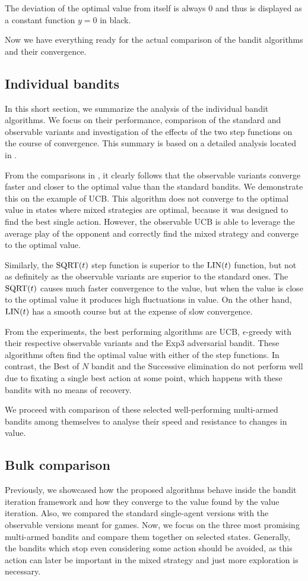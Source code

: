 \documentclass[../main.tex]{subfiles}
\begin{document}
The deviation of the optimal value from itself is always $0$ and thus is displayed as a constant function $y = 0$ in black.

Now we have everything ready for the actual comparison of the bandit algorithms and their convergence.

\subsection{Individual bandits}\label{exp:sg:individual}
In this short section, we summarize the analysis of the individual bandit algorithms.
We focus on their performance, comparison of the standard and observable variants and investigation of the effects of the two step functions on the course of convergence.
This summary is based on a detailed analysis located in .

From the comparisons in , it clearly follows that the observable variants converge faster and closer to the optimal value than the standard bandits.
We demonstrate this on the example of UCB.
This algorithm does not converge to the optimal value in states where mixed strategies are optimal, because it was designed to find the best single action.
However, the observable UCB is able to leverage the average play of the opponent and correctly find the mixed strategy and converge to the optimal value.

Similarly, the $\text{SQRT}(t)$ step function is superior to the $\text{LIN}(t)$ function, but not as definitely as the observable variants are superior to the standard ones.
The $\text{SQRT}(t)$ causes much faster convergence to the value, but when the value is close to the optimal value it produces high fluctuations in value.
On the other hand, $\text{LIN}(t)$ has a smooth course but at the expense of slow convergence.

From the experiments, the best performing algorithms are UCB, $\epsilon$-greedy with their respective observable variants and the Exp3 adversarial bandit.
These algorithms often find the optimal value with either of the step functions.
In contrast, the Best of $N$ bandit and the Successive elimination do not perform well due to fixating a single best action at some point, which happens with these bandits with no means of recovery.

We proceed with comparison of these selected well-performing multi-armed bandits among themselves to analyse their speed and resistance to changes in value.

\subsection{Bulk comparison}\label{exp:sg:best}
Previously, we showcased how the proposed algorithms behave inside the bandit iteration framework and how they converge to the value found by the value iteration.
Also, we compared the standard single-agent versions with the observable versions meant for games.
Now, we focus on the three most promising multi-armed bandits and compare them together on selected states.
Generally, the bandits which stop even considering some action should be avoided, as this action can later be important in the mixed strategy and just more exploration is necessary.
\end{document}
